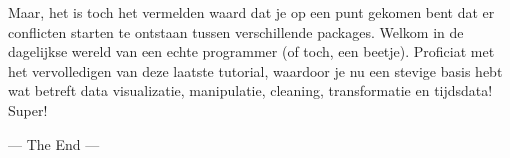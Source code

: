 \documentclass[]{tufte-book}
\begin{document}
Maar, het is toch het vermelden waard dat je op een punt gekomen bent dat er conflicten starten te ontstaan tussen verschillende packages. Welkom in de dagelijkse wereld van een echte programmer (of toch, een beetje). Proficiat met het vervolledigen van deze laatste tutorial, waardoor je nu een stevige basis hebt wat betreft data visualizatie, manipulatie, cleaning, transformatie en tijdsdata! Super!

--- The End ---


\end{document}
